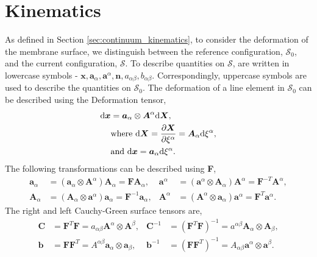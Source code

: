 \section{Kinematics}
As defined in Section \ref{sec:continuum_kinematics}, to consider the deformation of the membrane surface, we distinguish between the reference configuration,
 $\mathcal{S}_{0}$, and the current configuration, $\mathcal{S}$. To describe quantities on $\mathcal{S}$,
 are written in lowercase symbols - $\boldsymbol{x}, \boldsymbol{a}_{\alpha}, \boldsymbol{a}^{\alpha}, \boldsymbol{n}, a_{\alpha \beta}, b_{\alpha \beta}$.
 Correspondingly, uppercase symbols are used to describe the quantities on $\mathcal{S}_{0}$.
 The deformation of a line element in $\mathcal{S}_{0}$ can be described using the Deformation tensor,
\begin{equation}\label{curvy_F}
    \begin{split}
    \mathrm{d}\boldsymbol{x} &= {\boldsymbol{a}_{\alpha} \otimes \boldsymbol{A}^{\alpha}} \mathrm{d} \boldsymbol{X},\\
    &\text{where } \mathrm{d} \boldsymbol{X} = \frac{\partial \boldsymbol{X}}{\partial \xi^{\alpha}} = \boldsymbol{A}_{\alpha} \mathrm{d} \xi^{\alpha}, \notag\\
    &\text{and } \mathrm{d} \boldsymbol{x} = \boldsymbol{a}_{\alpha} \mathrm{d} \xi^{\alpha}. \notag
\end{split}
\end{equation}
The following transformations can be described using \textbf{F},
\begin{align}\label{a_and_A}
    \boldsymbol{a}_{\alpha} &= \left(\boldsymbol{a}_{\alpha} \otimes \boldsymbol{A}^{\alpha}\right) \boldsymbol{A}_{\alpha} = \boldsymbol{FA}_{\alpha},  &  \boldsymbol{a}^{\alpha} &= \left(\boldsymbol{a}^{\alpha} \otimes \boldsymbol{A}_{\alpha}\right) \boldsymbol{A}^{\alpha} = \boldsymbol{F}^{-T} \boldsymbol{A}^{\alpha},\\
    \boldsymbol{A}_{\alpha} &= \left(\boldsymbol{A}_{\alpha} \otimes \boldsymbol{a}^{\alpha}\right) \boldsymbol{a}_{\alpha} = \boldsymbol{F}^{-1} \boldsymbol{a}_{\alpha},  &   \boldsymbol{A}^{\alpha} &= \left(\boldsymbol{A}^{\alpha} \otimes \boldsymbol{a}_{\alpha}\right) \boldsymbol{a}^{\alpha} = \boldsymbol{F}^{T} \boldsymbol{a}^{\alpha}.
\end{align}
The right and left Cauchy-Green surface tensors are,
\begin{align}\label{curvy_strain}
    \boldsymbol{C} &= \boldsymbol{F}^{T} \boldsymbol{F} = a_{\alpha \beta} \boldsymbol{A}^{\alpha} \otimes \boldsymbol{A}^{\beta},   &   \boldsymbol{C}^{-1} &= (\boldsymbol{F}^{T} \boldsymbol{F})^{-1} = a^{\alpha \beta} \boldsymbol{A}_{\alpha} \otimes \boldsymbol{A}_{\beta},\\
    \boldsymbol{b} &= \boldsymbol{F} \boldsymbol{F}^{T} = A^{\alpha \beta} \boldsymbol{a}_{\alpha} \otimes \boldsymbol{a}_{\beta},  &   \boldsymbol{b}^{-1} &= (\boldsymbol{F} \boldsymbol{F}^{T})^{-1} = A_{\alpha \beta} \boldsymbol{a}^{\alpha} \otimes \boldsymbol{a}^{\beta}.
\end{align}


